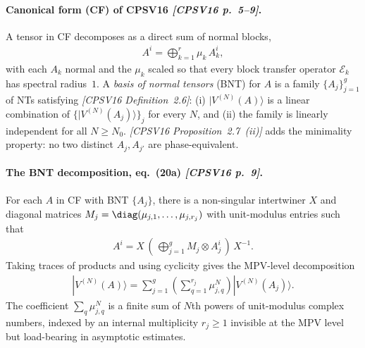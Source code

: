 \documentclass{article}
\newcommand{\paperref}[1]{\textit{[CPSV16 #1]}}
\theoremstyle{plain}
\begin{document}
\paragraph{Canonical form (CF) of CPSV16 \paperref{p.~5--9}.}
A tensor in CF decomposes as a direct sum of normal blocks,
\begin{align}
    A^i = \bigoplus_{k=1}^{r} \mu_k\, A_k^i,
    \label{eq:cf-def}
\end{align}
with each $A_k$ normal and the $\mu_k$ scaled so that every block transfer
operator $\mathcal{E}_k$ has spectral radius~$1$. A \emph{basis of normal
    tensors} (BNT) for $A$ is a family $\{A_j\}_{j=1}^{g}$ of NTs satisfying
\paperref{Definition~2.6}: (i) $|V^{(N)}(A)\rangle$ is a linear combination
of $\{|V^{(N)}(A_j)\rangle\}_j$ for every $N$, and (ii) the family is
linearly independent for all $N \ge N_0$. \paperref{Proposition~2.7~(ii)}
adds the minimality property: no two distinct $A_j, A_{j'}$ are
phase-equivalent.

\paragraph{The BNT decomposition, eq.~(20a) \paperref{p.~9}.}
For each $A$ in CF with BNT $\{A_j\}$, there is a non-singular intertwiner
$X$ and diagonal matrices $M_j = \diag(\mu_{j,1}, \ldots, \mu_{j,r_j})$
with unit-modulus entries such that
\begin{align}
    A^i = X\,\left(\,\bigoplus_{j=1}^{g} M_j \otimes A_j^i\,\right)\,X^{-1}.
    \label{eq:bnt-tensor-decomp}
\end{align}
Taking traces of products and using cyclicity gives the MPV-level
decomposition
\begin{align}
    |V^{(N)}(A)\rangle
    = \sum_{j=1}^{g} \left(\sum_{q=1}^{r_j} \mu_{j,q}^N\right)
    |V^{(N)}(A_j)\rangle.
    \label{eq:bnt-mpv-decomp}
\end{align}
The coefficient $\sum_q \mu_{j,q}^N$ is a finite sum of $N$th powers of
unit-modulus complex numbers, indexed by an internal multiplicity
$r_j \ge 1$ invisible at the MPV level but load-bearing in asymptotic
estimates.
\end{document}
